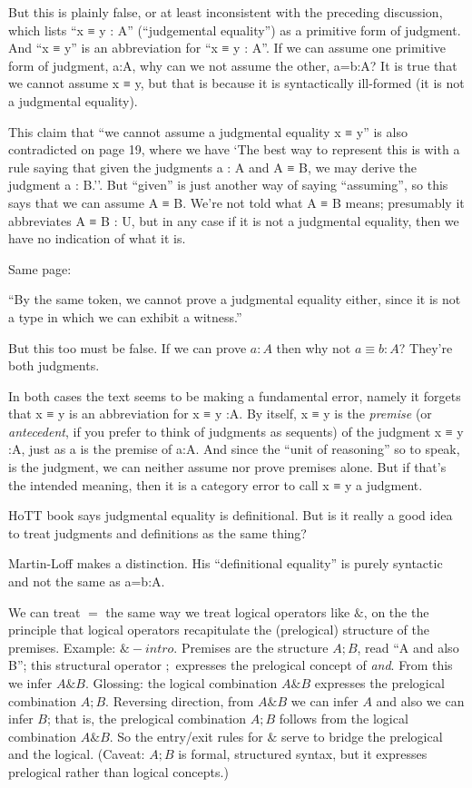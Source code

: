 \documentclass{article}
\begin{document}
But this is plainly false, or at least inconsistent with the preceding
discussion, which lists ``x ≡ y : A'' (``judgemental equality'') as a
primitive form of judgment. And ``x ≡ y'' is an abbreviation for ``x ≡
y : A''. If we can assume one primitive form of judgment, a:A, why can
we not assume the other, a=b:A? It is true that we cannot assume x ≡
y, but that is because it is syntactically ill-formed (it is not a
judgmental equality).

This claim that ``we cannot assume a judgmental equality x ≡ y'' is
also contradicted on page 19, where we have `The best way to represent
this is with a rule saying that given the judgments a : A and A ≡ B,
we may derive the judgment a : B.''. But ``given'' is just another way
of saying ``assuming'', so this says that we can assume A ≡ B. We're
not told what A ≡ B means; presumably it abbreviates A ≡ B : U, but in
any case if it is not a judgmental equality, then we have no
indication of what it is.

Same page:

\begin{displayquote}
``By the same token, we cannot prove a judgmental equality
either, since it is not a type in which we can exhibit a witness.''
\end{displayquote}

But this too must be false. If we can prove \(a:A\) then why not
\(a≡b:A\)? They're both judgments.

In both cases the text seems to be making a fundamental error, namely
it forgets that x ≡ y is an abbreviation for x ≡ y :A. By itself, x ≡
y is the \textit{premise} (or \textit{antecedent}, if you prefer to
think of judgments as sequents) of the judgment x ≡ y :A, just as a is
the premise of a:A. And since the ``unit of reasoning'' so to speak,
is the judgment, we can neither assume nor prove premises alone. But
if that's the intended meaning, then it is a category error to call x
≡ y a judgment.

HoTT book says judgmental equality is definitional. But is it really a
good idea to treat judgments and definitions as the same thing?

Martin-Loff makes a distinction. His ``definitional equality'' is
purely syntactic and not the same as a=b:A.

We can treat \(=\) the same way we treat logical operators like
\(\&\), on the the principle that logical operators recapitulate the
(prelogical) structure of the premises. Example: \(\&-intro\).
Premises are the structure \(A ; B\), read ``A and also B''; this
structural operator \(;\) expresses the prelogical concept of
\textit{and}. From this we infer \(A \& B\). Glossing: the logical
combination \(A\&B\) expresses the prelogical combination \(A;B\).
Reversing direction, from \(A\&B\) we can infer \(A\) and also we can
infer \(B\); that is, the prelogical combination \(A;B\) follows from
the logical combination \(A\&B\). So the entry/exit rules for \(\&\)
serve to bridge the prelogical and the logical. (Caveat: \(A;B\) is
formal, structured syntax, but it expresses prelogical rather than
logical concepts.)
\end{document}
